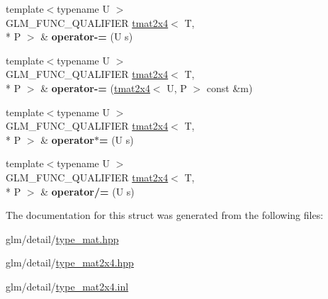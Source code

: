\begin{DoxyCompactItemize}
\item 
\hypertarget{structglm_1_1tmat2x4_affe8a407491e92988ba4e27c7971013b}{{\footnotesize template$<$typename U $>$ }\\G\-L\-M\-\_\-\-F\-U\-N\-C\-\_\-\-Q\-U\-A\-L\-I\-F\-I\-E\-R \hyperlink{structglm_1_1tmat2x4}{tmat2x4}$<$ T, \\*
P $>$ \& {\bfseries operator-\/=} (U s)}\label{structglm_1_1tmat2x4_affe8a407491e92988ba4e27c7971013b}

\item 
\hypertarget{structglm_1_1tmat2x4_a2413a5e38ef62a695afd3625b576f8a4}{{\footnotesize template$<$typename U $>$ }\\G\-L\-M\-\_\-\-F\-U\-N\-C\-\_\-\-Q\-U\-A\-L\-I\-F\-I\-E\-R \hyperlink{structglm_1_1tmat2x4}{tmat2x4}$<$ T, \\*
P $>$ \& {\bfseries operator-\/=} (\hyperlink{structglm_1_1tmat2x4}{tmat2x4}$<$ U, P $>$ const \&m)}\label{structglm_1_1tmat2x4_a2413a5e38ef62a695afd3625b576f8a4}

\item 
\hypertarget{structglm_1_1tmat2x4_a0df625aa1e2ff9d3bdcec091cfe49938}{{\footnotesize template$<$typename U $>$ }\\G\-L\-M\-\_\-\-F\-U\-N\-C\-\_\-\-Q\-U\-A\-L\-I\-F\-I\-E\-R \hyperlink{structglm_1_1tmat2x4}{tmat2x4}$<$ T, \\*
P $>$ \& {\bfseries operator$\ast$=} (U s)}\label{structglm_1_1tmat2x4_a0df625aa1e2ff9d3bdcec091cfe49938}

\item 
\hypertarget{structglm_1_1tmat2x4_ab5395e4e7c57f59d26790d2d640e4a81}{{\footnotesize template$<$typename U $>$ }\\G\-L\-M\-\_\-\-F\-U\-N\-C\-\_\-\-Q\-U\-A\-L\-I\-F\-I\-E\-R \hyperlink{structglm_1_1tmat2x4}{tmat2x4}$<$ T, \\*
P $>$ \& {\bfseries operator/=} (U s)}\label{structglm_1_1tmat2x4_ab5395e4e7c57f59d26790d2d640e4a81}

\end{DoxyCompactItemize}


The documentation for this struct was generated from the following files\-:\begin{DoxyCompactItemize}
\item 
glm/detail/\hyperlink{type__mat_8hpp}{type\-\_\-mat.\-hpp}\item 
glm/detail/\hyperlink{type__mat2x4_8hpp}{type\-\_\-mat2x4.\-hpp}\item 
glm/detail/\hyperlink{type__mat2x4_8inl}{type\-\_\-mat2x4.\-inl}\end{DoxyCompactItemize}
